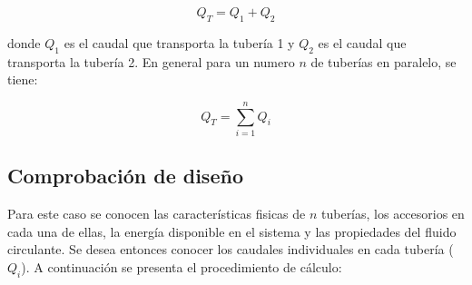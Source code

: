 \documentclass[10pt, oneside]{article}
\begin{document}
\begin{itemize}
\begin{equation}
Q_T = Q_1 + Q_2
\label{para4}
\end{equation}

donde $Q_1$ es el caudal que transporta la tuber\'ia 1 y $Q_2$ es el caudal que transporta la tuber\'ia 2. En general para un numero $n$ de tuber\'ias en paralelo, se tiene:

\begin{equation}
Q_T = \sum_{i=1}^n Q_i
\label{para5}
\end{equation}
\end{itemize}

\subsection{Comprobaci\'on de dise\~no}
Para este caso se conocen las caracter\'isticas fisicas de $n$ tuber\'ias, los accesorios en cada una de ellas, la energ\'ia disponible en el sistema y las propiedades del fluido circulante. Se desea entonces conocer los caudales individuales en cada tuber\'ia ($Q_i$). A continuaci\'on se presenta el procedimiento de c\'alculo: 
\end{document}
